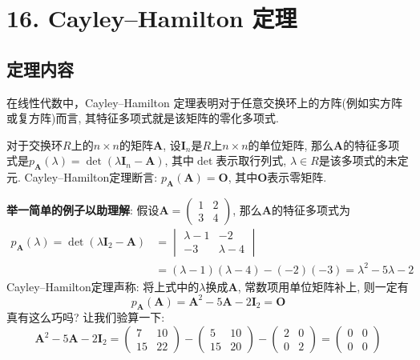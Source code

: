 \documentclass[main]{subfiles}
\begin{document}
\renewcommand{\filename}{16. Cayley–Hamilton 定理}%
\section*{16. Cayley–Hamilton 定理}
	\subsection*{定理内容}
		在线性代数中，Cayley–Hamilton 定理表明对于任意交换环上的方阵(例如实方阵或复方阵)而言, 其特征多项式就是该矩阵的零化多项式. 
		
		对于交换环$R$上的$n\times n$的矩阵$\boldsymbol{A}$, 设$\boldsymbol{I}_n$是$R$上$n\times n$的单位矩阵, 那么$\boldsymbol{A}$的特征多项式是$p_{\boldsymbol{A}}(\lambda)=\det(\lambda \boldsymbol{I}_n-\boldsymbol{A})$, 其中$\det$表示取行列式, $\lambda\in R$是该多项式的未定元. Cayley–Hamilton定理断言: $p_{\boldsymbol{A}}(\boldsymbol{A})=\boldsymbol{O}$, 其中$\boldsymbol{O}$表示零矩阵.
		
		\textbf{举一简单的例子以助理解}: 假设$\boldsymbol{A}=\begin{pmatrix}
			1 & 2 \\
			3 & 4
		\end{pmatrix}$, 那么$\boldsymbol{A}$的特征多项式为
		\[\begin{aligned}
			p_{\boldsymbol{A}}(\lambda)=\det(\lambda \boldsymbol{I}_2-\boldsymbol{A})&=\begin{vmatrix}
				\lambda-1 & -2 \\
				-3 & \lambda-4
			\end{vmatrix}\\
			&=(\lambda-1)(\lambda-4)-(-2)(-3)=\lambda^{2}-5\lambda-2
		\end{aligned}\]
		Cayley–Hamilton定理声称: 将上式中的$\lambda$换成$\boldsymbol{A}$, 常数项用单位矩阵补上, 则一定有
		\[p_{\boldsymbol{A}}(\boldsymbol{A})=\boldsymbol{A}^2-5\boldsymbol{A}-2\boldsymbol{I}_2=\boldsymbol{O}\]
		真有这么巧吗? 让我们验算一下: 
		\[\boldsymbol{A}^2-5\boldsymbol{A}-2\boldsymbol{I}_2=\begin{pmatrix}
			7 & 10 \\
			15 & 22
		\end{pmatrix}
		-\begin{pmatrix}
			5 & 10 \\
			15 & 20
		\end{pmatrix}
		-\begin{pmatrix}
			2 & 0 \\
			0 & 2
		\end{pmatrix}
		=\begin{pmatrix}
			0 & 0 \\
			0 & 0
		\end{pmatrix}\]
		
\end{document}
